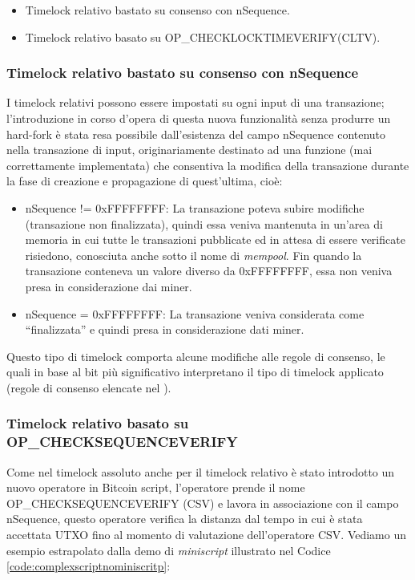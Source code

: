 \begin{itemize}
  \item Timelock relativo bastato su consenso con nSequence.
  \item Timelock relativo basato su OP\_CHECKLOCKTIMEVERIFY(CLTV).
\end{itemize}

\subsubsection{Timelock relativo bastato su consenso con nSequence}
\label{sec:relativetimelock}
I timelock relativi possono essere impostati su ogni input di una transazione; l’introduzione in corso d’opera di questa nuova funzionalità senza produrre un hard-fork è stata resa possibile dall’esistenza del campo nSequence contenuto nella transazione di input, originariamente destinato ad una funzione (mai correttamente implementata) che consentiva la modifica della transazione durante la fase di creazione e propagazione di quest’ultima, cioè:

\begin{itemize}
  \item nSequence != 0xFFFFFFFF: La transazione poteva subire modifiche (transazione non finalizzata), quindi essa veniva mantenuta in un'area di memoria in cui tutte le transazioni pubblicate ed in attesa di essere verificate risiedono, conosciuta anche sotto il nome di {\it mempool\/}. Fin quando la transazione conteneva un valore diverso da 0xFFFFFFFF, essa non veniva presa in considerazione dai miner.
  \item nSequence = 0xFFFFFFFF: La transazione veniva considerata come “finalizzata” e quindi presa in considerazione dati miner.
\end{itemize}

Questo tipo di timelock comporta alcune modifiche alle regole di consenso, le quali in base al bit più significativo interpretano il tipo di timelock applicato (regole di consenso elencate nel \cite{bitcoinbip:bip68}).

\subsubsection{Timelock relativo basato su OP\_CHECKSEQUENCEVERIFY}

Come nel timelock assoluto anche per il timelock relativo è stato introdotto un nuovo operatore in Bitcoin script, l’operatore prende il nome
OP\_CHECK\-SEQUENCE\-VERIFY (CSV) e lavora in associazione con il campo nSequence, questo operatore verifica la distanza dal tempo in cui è stata accettata UTXO  fino al momento di valutazione dell'operatore CSV. Vediamo un esempio estrapolato dalla demo di {\it miniscript \/} illustrato nel Codice \ref{code:complexscriptnominiscritp}:

